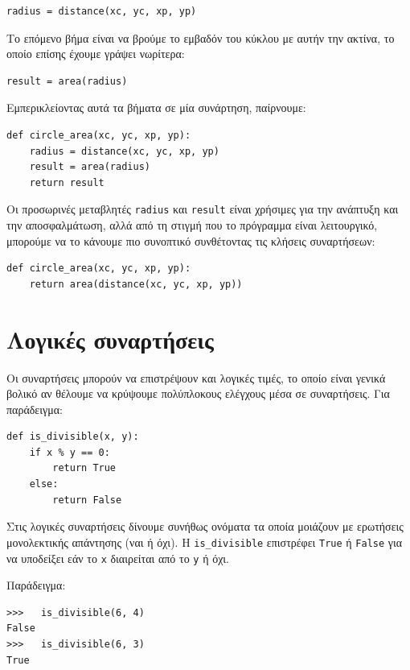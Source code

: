 \documentclass[10pt]{book}
\begin{document}
\begin{verbatim}
radius = distance(xc, yc, xp, yp)
\end{verbatim}
%

Το επόμενο βήμα είναι να βρούμε το εμβαδόν του κύκλου με αυτήν την ακτίνα,
το οποίο επίσης έχουμε γράψει νωρίτερα:

\begin{verbatim}
result = area(radius)
\end{verbatim}
%

Εμπερικλείοντας αυτά τα βήματα σε μία συνάρτηση, παίρνουμε:

\begin{verbatim}
def circle_area(xc, yc, xp, yp):
    radius = distance(xc, yc, xp, yp)
    result = area(radius)
    return result
\end{verbatim}
%

Οι προσωρινές μεταβλητές {\tt radius} και {\tt result} είναι
χρήσιμες για την ανάπτυξη και την αποσφαλμάτωση, αλλά από τη στιγμή που το πρόγραμμα είναι λειτουργικό, μπορούμε να το κάνουμε πιο συνοπτικό συνθέτοντας τις κλήσεις συναρτήσεων:

\begin{verbatim}
def circle_area(xc, yc, xp, yp):
    return area(distance(xc, yc, xp, yp))
\end{verbatim}
%


\section{Λογικές συναρτήσεις}
\label{boolean}

Οι συναρτήσεις μπορούν να επιστρέψουν και λογικές τιμές, το οποίο είναι
γενικά βολικό αν θέλουμε να κρύψουμε πολύπλοκους ελέγχους μέσα σε συναρτήσεις.
Για παράδειγμα:

\begin{verbatim}
def is_divisible(x, y):
    if x % y == 0:
        return True
    else:
        return False
\end{verbatim}
%

Στις λογικές συναρτήσεις δίνουμε συνήθως ονόματα τα οποία μοιάζουν με ερωτήσεις
μονολεκτικής απάντησης (ναι ή όχι). Η \verb"is_divisible" επιστρέφει 
{\tt True} ή {\tt False} για να υποδείξει εάν το {\tt x} διαιρείται
από το {\tt y} ή όχι.

Παράδειγμα:

\begin{verbatim}
>>>   is_divisible(6, 4)
False
>>>   is_divisible(6, 3)
True
\end{verbatim}
%
\end{document}
